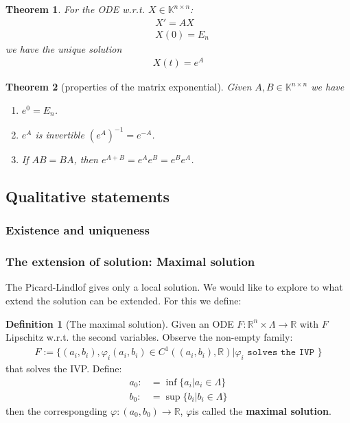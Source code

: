 \documentclass[12pt,fleqn]{book}
\newtheorem{theorem}{Theorem}[section]
\theoremstyle{definition}
\newtheorem{definition}{Definition}[section]
\begin{document}
\begin{theorem}
	For the ODE w.r.t. $X \in \mathbb{K}^{n \times n}$:
	\begin{align*}
		&X' = AX\\
		&X(0) = E_n
	\end{align*}
	we have the unique solution
	\begin{align*}
		X(t) = e^A
	\end{align*}
\end{theorem}

\begin{theorem}[properties of the matrix exponential]
Given $A, B \in \mathbb{K}^{n \times n}$ we have
\begin{enumerate}
	\item $e^0 = E_n$.
	\item $e^A$ is invertible $(e^A)^{-1} = e^{-A}$.
	\item If $AB = BA$, then $e^{A + B} = e^{A} e^B = e^B e^A$. 
\end{enumerate}
\end{theorem}



\subsection{Qualitative statements}
\subsubsection*{Existence and uniqueness}
\subsubsection*{The extension of solution: Maximal solution}
The Picard-Lindlof gives only a local solution. We would like to explore to what extend the solution can be extended. For this we define:
\begin{definition}[The maximal solution]
	Given an ODE $F: \mathbb{R}^n \times \Lambda \rightarrow \mathbb{R}$ with $F$ Lipschitz w.r.t. the second variables. Observe the non-empty family:
	\begin{align*}
		F:= \{ (a_i, b_i), \varphi_i(a_i, b_i) \in C^1((a_i, b_i), \mathbb{R}) | \varphi_i \texttt{ solves the IVP } \}
	\end{align*}
	that solves the IVP. Define:
	\begin{align*}
		a_0:&= \inf\{a_i| a_i \in \Lambda\}\\
		b_0:&= \sup\{b_i| b_i \in \Lambda\}
	\end{align*}
	then the correspongding $\varphi: (a_0, b_0) \rightarrow \mathbb{R}$, $\varphi$is called the \textbf{maximal solution}. 
\end{definition}
\end{document}
